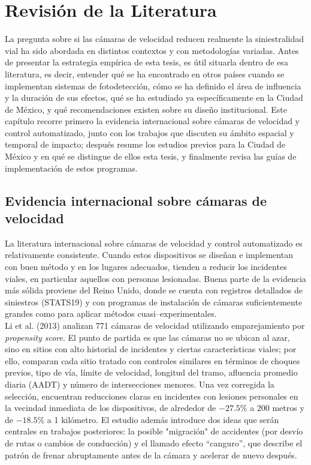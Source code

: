 \chapter{Revisión de la Literatura}

\noindent La pregunta sobre si las cámaras de velocidad reducen realmente la siniestralidad vial ha sido abordada en distintos contextos y con metodologías variadas. Antes de presentar la estrategia empírica de esta tesis, es útil situarla dentro de esa literatura, es decir, entender qué se ha encontrado en otros países cuando se implementan sistemas de fotodetección, cómo se ha definido el área de influencia y la duración de sus efectos, qué se ha estudiado ya específicamente en la Ciudad de México, y qué recomendaciones existen sobre su diseño institucional. Este capítulo recorre primero la evidencia internacional sobre cámaras de velocidad y control automatizado, junto con los trabajos que discuten su ámbito espacial y temporal de impacto; después resume los estudios previos para la Ciudad de México y en qué se distingue de ellos esta tesis, y finalmente revisa las guías de implementación de estos programas.

\section{Evidencia internacional sobre cámaras de velocidad}

\noindent La literatura internacional sobre cámaras de velocidad y control automatizado es relativamente consistente. Cuando estos dispositivos se diseñan e implementan con buen método y en los lugares adecuados, tienden a reducir los incidentes viales, en particular aquellos con personas lesionadas. Buena parte de la evidencia más sólida proviene del Reino Unido, donde se cuenta con registros detallados de siniestros (STATS19) y con programas de instalación de cámaras suficientemente grandes como para aplicar métodos cuasi–experimentales.\\

Li et al. (2013) analizan 771 cámaras de velocidad utilizando emparejamiento por \emph{propensity score}. El punto de partida es que las cámaras no se ubican al azar, sino en sitios con alto historial de incidentes y ciertas características viales; por ello, comparan cada sitio tratado con controles similares en términos de choques previos, tipo de vía, límite de velocidad, longitud del tramo, afluencia promedio diaria (AADT) y número de intersecciones menores. Una vez corregida la selección, encuentran reducciones claras en incidentes con lesiones personales en la vecindad inmediata de los dispositivos, de alrededor de $-27.5$\% a 200 metros y de $-18.5$\% a 1 kilómetro. El estudio además introduce dos ideas que serán centrales en trabajos posteriores: la posible "migración" de accidentes (por desvío de rutas o cambios de conducción) y el llamado efecto ``canguro'', que describe el patrón de frenar abruptamente antes de la cámara y acelerar de nuevo después.\\ 

